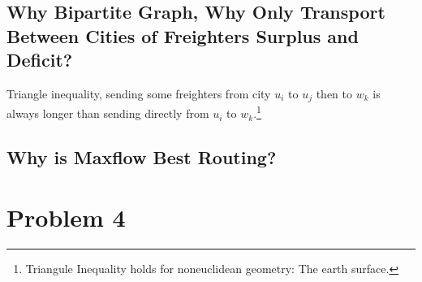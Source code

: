 \documentclass[]{article}
\theoremstyle{definition}
\begin{document}
    \subsection{Why Bipartite Graph, Why Only Transport Between Cities of Freighters Surplus and Deficit? }
        Triangle inequality, sending some freighters from city $u_i$ to $u_j$ then to $w_k$ is always longer than sending directly from $u_i$ to $w_k$.\footnote{Triangule Inequality holds for noneuclidean geometry: The earth surface.}
    \subsection{Why is Maxflow Best Routing?}
        
        

        
        

\section{Problem 4}
\end{document}
